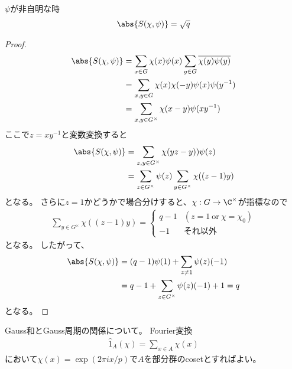 \documentclass{jsarticle}
\begin{document}
\begin{prop}[Gauss和の評価]
$\psi$が非自明な時
\begin{align*}
\abs{S(\chi,\psi)}=\sqrt{q}
\end{align*}
\end{prop}
\begin{proof}
\begin{align*}
\abs{S(\chi,\psi)}&=\sum_{x\in G}\chi(x)\psi(x)\sum_{y\in G}\overline{\chi(y)}\overline{\psi(y)}\\
&=\sum_{x,y\in G}\chi(x)\chi(-y)\psi(x)\psi(y^{-1})\\
&=\sum_{x,y\in G^\times}\chi(x-y)\psi(xy^{-1})
\end{align*}
ここで$z=xy^{-1}$と変数変換すると
\begin{align*}
\abs{S(\chi,\psi)}&=\sum_{z,y\in G^\times}\chi(yz-y))\psi(z)\\
&=\sum_{z\in G^\times}\psi(z)\sum_{y\in G^\times}\chi((z-1)y)
\end{align*}
となる。
さらに$z=1$かどうかで場合分けすると、$\chi:G\to\C^\times$が指標なので
\begin{align*}
\sum_{y\in G^\times}\chi((z-1)y)=\begin{cases}q-1&(z=1~\mbox{or}~\chi=\chi_0)\\-1&\mbox{それ以外}\end{cases}
\end{align*}
となる。
したがって、
\begin{align*}
\abs{S(\chi,\psi)}&=(q-1)\psi(1)+\sum_{z\neq1}\psi(z)(-1)\\
&=q-1+\sum_{z\in G^\times}\psi(z)(-1)+1=q
\end{align*}
となる。
\end{proof}

Gauss和とGauss周期の関係について。
Fourier変換
\begin{align*}
\hat{1}_A(\chi)=\sum_{x\in A}\chi(x)
\end{align*}
において$\chi(x)=\exp(2\pi ix/p)$で$A$を部分群のcosetとすればよい。
\end{document}
